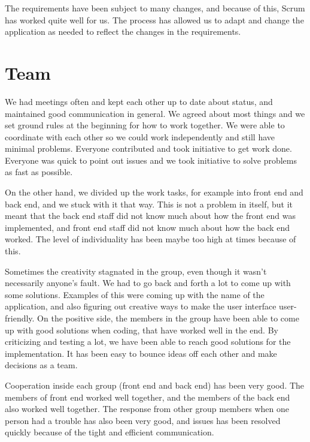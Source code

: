 The requirements have been subject to many changes, and because of this, Scrum has worked quite well for us. The process has allowed us to adapt and change the application as needed to reflect the changes in the requirements.

\section{Team}

We had meetings often and kept each other up to date about status, and maintained good communication in general. We agreed about most things and we set ground rules at the beginning for how to work together. We were able to coordinate with each other so we could work independently and still have minimal problems. Everyone contributed and took initiative to get work done. Everyone was quick to point out issues and we took initiative to solve problems as fast as possible.\newline

On the other hand, we divided up the work tasks, for example into front end and back end, and we stuck with it that way. This is not a problem in itself, but it meant that the back end staff did not know much about how the front end was implemented, and front end staff did not know much about how the back end worked. The level of individuality has been maybe too high at times because of this.\newline

Sometimes the creativity stagnated in the group, even though it wasn't necessarily anyone's fault. We had to go back and forth a lot to come up with some solutions. Examples of this were coming up with the name of the application, and also figuring out creative ways to make the user interface user-friendly. On the positive side, the members in the group have been able to come up with good solutions when coding, that have worked well in the end. By criticizing and testing a lot, we have been able to reach good solutions for the implementation. It has been easy to bounce ideas off each other and make decisions as a team.\newline

Cooperation inside each group (front end and back end) has been very good. The members of front end worked well together, and the members of the back end also worked well together. The response from other group members when one person had a trouble has also been very good, and issues has been resolved quickly because of the tight and efficient communication.\newline

